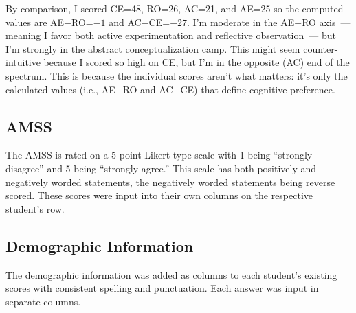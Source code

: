 By comparison, I scored CE=48, RO=26, AC=21, and AE=25 so the computed values are AE$-$RO=$-1$ and AC$-$CE=$-27$. I'm moderate in the AE$-$RO axis~--- meaning I favor both active experimentation and reflective observation~--- but I'm strongly in the abstract conceptualization camp. This might seem counter-intuitive because I scored so high on CE, but I'm in the opposite (AC) end of the spectrum. This is because the individual scores aren't what matters: it's only the calculated values (i.e., AE$-$RO and AC$-$CE) that define cognitive preference.

\subsection{AMSS}
The AMSS is rated on a 5-point Likert-type scale with 1 being ``strongly disagree'' and 5 being ``strongly agree.'' This scale has both positively and negatively worded statements, the negatively worded statements being reverse scored. These scores were input into their own columns on the respective student's row.

\subsection{Demographic Information}
The demographic information was added as columns to each student's existing scores with consistent spelling and punctuation. Each answer was input in separate columns.
